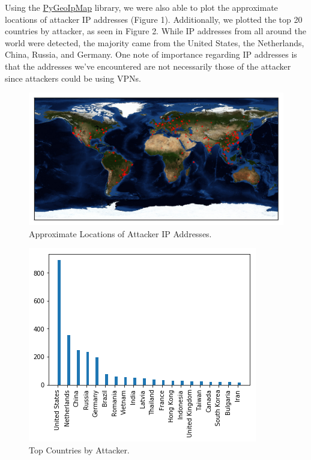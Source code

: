 Using the \href{https://github.com/pieqq/PyGeoIpMap}{PyGeoIpMap} library, we were also able to plot the approximate locations of attacker IP addresses (Figure 1). Additionally, we plotted the top 20 countries by attacker, as seen in Figure 2. While IP addresses from all around the world were detected, the majority came from the United States, the Netherlands, China, Russia, and Germany. One note of importance regarding IP addresses is that the addresses we've encountered are not necessarily those of the attacker since attackers could be using VPNs.

\begin{figure}[H]
	\includegraphics[width=\linewidth]{output.png}
	\caption{Approximate Locations of Attacker IP Addresses.}
	\label{fig:map}
\end{figure}


\begin{figure}
	\includegraphics[width=\linewidth]{countries.png}
	\caption{Top Countries by Attacker.}
	\label{fig:top-countries}
\end{figure}
